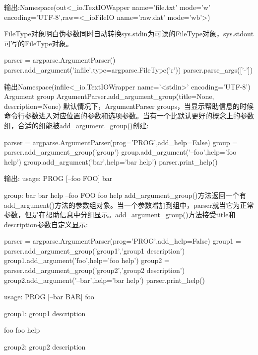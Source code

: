 输出:Namespace(out<\_io.TextIOWapper name='file.txt' mode='w' encoding='UTF-8',raw=<\_ioFileIO name='raw.dat' mode='wb'>)\par
FileType对象明白伪参数同时自动转换sys.stdin为可读的FileType对象，sys.stdout
可写的FileType对象。
\begin{python}
parser = argparse.ArgumentParser()
parser.add_argument('infile',type=argparse.FileType('r'))
parser.parse_args(['-'])
\end{python}
输出Namespace(infile<\_io.TextIOWrapper name='<stdin>' encoding='UTF-8')
Argument group\newline
ArgumentParser.add\_argument\_group(title=None, description=None)\newline
默认情况下，ArgumentParser groups，当显示帮助信息的时候命令行参数进入对应位置的参数和选项参数。当有一个比默认更好的概念上的参数组，合适的组能被add\_argument\_group()创建:
\begin{python}
parser = argparse.ArgumentParser(prog='PROG',add_help=False)
group = parser.add_argument_group('group')
group.add_argument('--foo',help='foo help')
group.add_argument('bar',help='bar help')
parser.print_help()

\end{python}
输出:
usage: PROG [--foo FOO] bar\newline

group:\newline
  bar    bar help\newline
  --foo FOO  foo help\newline
add\_argument\_group()方法返回一个有add\_argument()方法的参数组对象。当一个参数增加到组中，parser就当它为正常参数，但是在帮助信息中分组显示。add\_argument\_group()方法接受title和description参数自定义显示:
\begin{python}
parser = argparse.ArgumentParser(prog='PROG',add_help=False)
group1 = parser.add_argument_group('group1','group1 description')
group1.add_argument('foo',help='foo help')
group2 = parser.add_argument_group('group2','group2 description')
group2.add_argument('--bar',help='bar help')
parser.print_help()
\end{python}
usage: PROG [--bar BAR] foo\newline

group1:\newline
  group1 description\newline

  foo    foo help\newline

group2:\newline
  group2 description\newline

